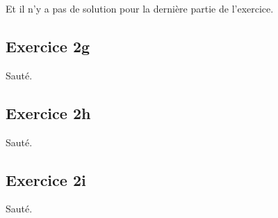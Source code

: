 Et il n'y a pas de solution pour la dernière partie
de l'exercice.



\subsection*{Exercice 2g}
Sauté.


\subsection*{Exercice 2h}
Sauté.


\subsection*{Exercice 2i}
Sauté.
